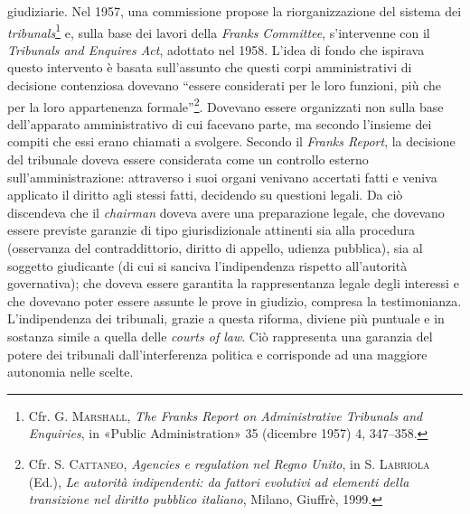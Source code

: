 \documentclass[12pt,it,a4paper,]{report}
\begin{document}
giudiziarie. Nel 1957, una commissione propose la riorganizzazione del
sistema dei \emph{tribunals}\footnote{Cfr. G. \textsc{Marshall},
  \emph{The Franks Report on Administrative Tribunals and Enquiries}, in
  {«Public Administration»} 35 (dicembre 1957) 4, 347--358.} e, sulla
base dei lavori della \emph{Franks Committee}, s'intervenne con il
\emph{Tribunals and Enquires Act}, adottato nel 1958. L'idea di fondo
che ispirava questo intervento è basata sull'assunto che questi corpi
amministrativi di decisione contenziosa dovevano ``essere considerati
per le loro funzioni, più che per la loro appartenenza
formale''\footnote{Cfr. S. \textsc{Cattaneo}, \emph{Agencies e
  regulation nel Regno Unito}, in S. \textsc{Labriola} (Ed.), \emph{Le
  autorità indipendenti: da fattori evolutivi ad elementi della
  transizione nel diritto pubblico italiano}, Milano, Giuffrè, 1999.}.
Dovevano essere organizzati non sulla base dell'apparato amministrativo
di cui facevano parte, ma secondo l'insieme dei compiti che essi erano
chiamati a svolgere. Secondo il \emph{Franks Report}, la decisione del
tribunale doveva essere considerata come un controllo esterno
sull'amministrazione: attraverso i suoi organi venivano accertati fatti
e veniva applicato il diritto agli stessi fatti, decidendo su questioni
legali. Da ciò discendeva che il \emph{chairman} doveva avere una
preparazione legale, che dovevano essere previste garanzie di tipo
giurisdizionale attinenti sia alla procedura (osservanza del
contraddittorio, diritto di appello, udienza pubblica), sia al soggetto
giudicante (di cui si sanciva l'indipendenza rispetto all'autorità
governativa); che doveva essere garantita la rappresentanza legale degli
interessi e che dovevano poter essere assunte le prove in giudizio,
compresa la testimonianza. L'indipendenza dei tribunali, grazie a questa
riforma, diviene più puntuale e in sostanza simile a quella delle
\emph{courts of law}. Ciò rappresenta una garanzia del potere dei
tribunali dall'interferenza politica e corrisponde ad una maggiore
autonomia nelle scelte.
\end{document}
